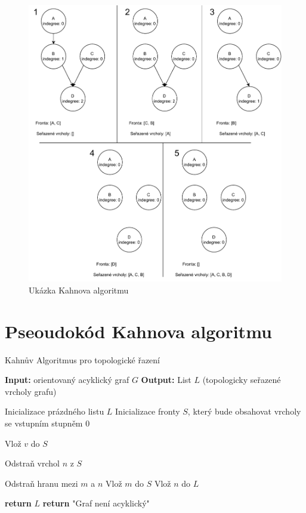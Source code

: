 \documentclass[12pt]{report}
\begin{document}
	\begin{figure}[h]
		\centering
		\includegraphics[width=.9\textwidth]{img/kahn}
		\caption{Ukázka Kahnova algoritmu}
		\label{fig:kahn}
	\end{figure}


\newpage

\section*{Pseoudokód Kahnova algoritmu}
	\begin{algorithm}[h]
		\caption{Kahnův Algoritmus pro topologické řazení}
		\begin{algorithmic}[1]
			\State \textbf{Input:} orientovaný acyklický graf $G$
			\State \textbf{Output:} List $L$ (topologicky seřazené vrcholy grafu)
			
			\State Inicializace prázdného listu $L$
			\State Inicializace fronty $S$, který bude obsahovat vrcholy se vstupním stupněm 0
			
			\State Vlož $v$ do $S$
			\EndIf
			\EndFor
			
			\State Odstraň vrchol $n$ z $S$
			
			
			\State Odstraň hranu mezi $m$ a $n$
			\State Vlož $m$ do $S$
			\EndIf
			\EndFor
			\State Vlož $n$ do $L$
			\EndWhile
			
			\State \textbf{return} $L$ 
			\Else
			\State \textbf{return} "Graf není acyklický"
			\EndIf
			\EndProcedure
		\end{algorithmic}
	\end{algorithm}
\end{document}
